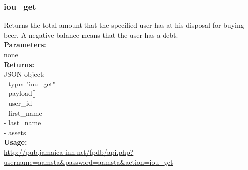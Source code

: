 \documentclass{article}
\begin{document}
\subsubsection{iou\_get}
Returns the total amount that the specified user has at his disposal for buying beer. A negative balance means that the user has a debt.\\
\textbf{Parameters:}\\
none\\
\textbf{Returns:}\\
JSON-object:\\
- type: "iou\_get"\\
- payload[]\\
\indent - user\_id\\
\indent - first\_name\\
\indent - last\_name\\
\indent - assets\\
\textbf{Usage:}\\
\url{http://pub.jamaica-inn.net/fpdb/api.php?username=aamsta\&password=aamsta\&action=iou\_get}\\
 
\end{document}
